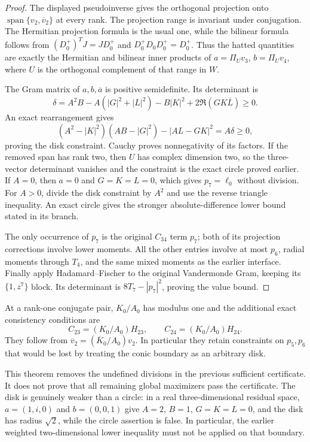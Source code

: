\documentclass[11pt]{article}
\theoremstyle{remark}
\numberwithin{equation}{section}
\begin{document}
\begin{proof}
The displayed pseudoinverse gives the orthogonal projection onto
$\operatorname{span}\{v_2,\overline v_2\}$ at every rank.
The projection range is invariant under conjugation. The Hermitian
projection formula is the usual one, while the bilinear formula
follows from $(D_0^+)^TJ=JD_0^+$ and
$D_0^+D_0D_0^+=D_0^+$. Thus the hatted quantities are exactly
the Hermitian and bilinear inner products of
$a=\Pi_Uv_3$, $b=\Pi_Uv_4$, where $U$ is the orthogonal
complement of that range in $W$.

The Gram matrix of $a,b,\overline a$ is positive semidefinite.
Its determinant is
\[
 \delta=A^2B-A(|G|^2+|L|^2)-B|K|^2
                 +2\Re(GK\overline L)\ge0.
\]
An exact rearrangement gives
\[
 (A^2-|K|^2)(AB-|G|^2)-|AL-GK|^2=A\delta\ge0,
\]
proving the disk constraint. Cauchy proves nonnegativity of its
factors. If the removed span has rank two, then $U$ has complex
dimension two, so the three-vector determinant vanishes and the
constraint is the exact circle proved earlier.
If $A=0$, then $a=0$ and $G=K=L=0$, which gives
$p_7=\ell_0$ without division. For $A>0$, divide the disk
constraint by $A^2$ and use the reverse triangle inequality.
An exact circle gives the stronger absolute-difference lower
bound stated in its branch.

The only occurrence of $p_7$ is the original $C_{34}$ term
$p_7$; both of its projection corrections involve lower moments.
All the other entries involve at most $p_6$, radial moments through
$T_4$, and the same mixed moments as the earlier interface.
Finally apply Hadamard--Fischer to the original Vandermonde Gram,
keeping its $\{1,z^7\}$ block. Its determinant is
$8T_7-|p_7|^2$, proving the value bound.
\end{proof}

At a rank-one conjugate pair, $K_0/A_0$ has modulus one and the
additional exact consistency conditions are
\[
             C_{23}=(K_0/A_0)H_{23},\qquad
             C_{24}=(K_0/A_0)H_{24}.
\]
They follow from $\overline v_2=(\overline K_0/A_0)v_2$.
In particular they retain constraints on $p_5,p_6$ that would be
lost by treating the conic boundary as an arbitrary disk.

This theorem removes the undefined divisions in the previous
sufficient certificate. It does not prove that all remaining
global maximizers pass the certificate. The disk is genuinely
weaker than a circle: in a real three-dimensional residual space,
$a=(1,i,0)$ and $b=(0,0,1)$ give $A=2$, $B=1$, $G=K=L=0$,
and the disk has radius $\sqrt2$, while the circle assertion is
false. In particular, the earlier weighted two-dimensional
lower inequality must not be applied on that boundary.
\end{document}
